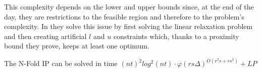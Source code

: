 This complexity depends on the lower and upper bounds since, at the end of the day, they are restrictions to the feasible region and therefore to the problem's complexity. In \cite{EISENBRAND:2018} they solve this issue by first solving the linear relaxation problem and then creating artificial $l$ and $u$ constraints which, thanks to a proximity bound they prove, keeps at least one optimum.

\begin{lemma}
    The N-Fold IP can be solved in time $(nt)^2 log^2(nt) \cdot \varphi (rs\Delta)^{O(r^2s + rs^2)} + LP$
\end{lemma}
        